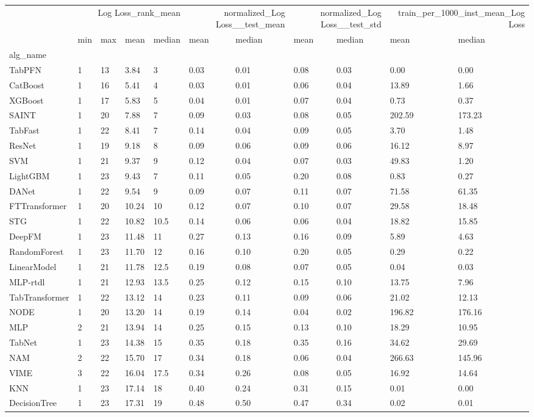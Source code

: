 \begin{tabular}{lllllllllll}
\toprule
 & \multicolumn{4}{r}{Log Loss_rank_mean} & \multicolumn{2}{r}{normalized_Log Loss__test_mean} & \multicolumn{2}{r}{normalized_Log Loss__test_std} & \multicolumn{2}{r}{train_per_1000_inst_mean_Log Loss} \\
 & min & max & mean & median & mean & median & mean & median & mean & median \\
alg_name &  &  &  &  &  &  &  &  &  &  \\
\midrule
TabPFN & 1 & 13 & 3.84 & 3 & 0.03 & 0.01 & 0.08 & 0.03 & 0.00 & 0.00 \\
CatBoost & 1 & 16 & 5.41 & 4 & 0.03 & 0.01 & 0.06 & 0.04 & 13.89 & 1.66 \\
XGBoost & 1 & 17 & 5.83 & 5 & 0.04 & 0.01 & 0.07 & 0.04 & 0.73 & 0.37 \\
SAINT & 1 & 20 & 7.88 & 7 & 0.09 & 0.03 & 0.08 & 0.05 & 202.59 & 173.23 \\
TabFast & 1 & 22 & 8.41 & 7 & 0.14 & 0.04 & 0.09 & 0.05 & 3.70 & 1.48 \\
ResNet & 1 & 19 & 9.18 & 8 & 0.09 & 0.06 & 0.09 & 0.06 & 16.12 & 8.97 \\
SVM & 1 & 21 & 9.37 & 9 & 0.12 & 0.04 & 0.07 & 0.03 & 49.83 & 1.20 \\
LightGBM & 1 & 23 & 9.43 & 7 & 0.11 & 0.05 & 0.20 & 0.08 & 0.83 & 0.27 \\
DANet & 1 & 22 & 9.54 & 9 & 0.09 & 0.07 & 0.11 & 0.07 & 71.58 & 61.35 \\
FTTransformer & 1 & 20 & 10.24 & 10 & 0.12 & 0.07 & 0.10 & 0.07 & 29.58 & 18.48 \\
STG & 1 & 22 & 10.82 & 10.5 & 0.14 & 0.06 & 0.06 & 0.04 & 18.82 & 15.85 \\
DeepFM & 1 & 23 & 11.48 & 11 & 0.27 & 0.13 & 0.16 & 0.09 & 5.89 & 4.63 \\
RandomForest & 1 & 23 & 11.70 & 12 & 0.16 & 0.10 & 0.20 & 0.05 & 0.29 & 0.22 \\
LinearModel & 1 & 21 & 11.78 & 12.5 & 0.19 & 0.08 & 0.07 & 0.05 & 0.04 & 0.03 \\
MLP-rtdl & 1 & 21 & 12.93 & 13.5 & 0.25 & 0.12 & 0.15 & 0.10 & 13.75 & 7.96 \\
TabTransformer & 1 & 22 & 13.12 & 14 & 0.23 & 0.11 & 0.09 & 0.06 & 21.02 & 12.13 \\
NODE & 1 & 20 & 13.20 & 14 & 0.19 & 0.14 & 0.04 & 0.02 & 196.82 & 176.16 \\
MLP & 2 & 21 & 13.94 & 14 & 0.25 & 0.15 & 0.13 & 0.10 & 18.29 & 10.95 \\
TabNet & 1 & 23 & 14.38 & 15 & 0.35 & 0.18 & 0.35 & 0.16 & 34.62 & 29.69 \\
NAM & 2 & 22 & 15.70 & 17 & 0.34 & 0.18 & 0.06 & 0.04 & 266.63 & 145.96 \\
VIME & 3 & 22 & 16.04 & 17.5 & 0.34 & 0.26 & 0.08 & 0.05 & 16.92 & 14.64 \\
KNN & 1 & 23 & 17.14 & 18 & 0.40 & 0.24 & 0.31 & 0.15 & 0.01 & 0.00 \\
DecisionTree & 1 & 23 & 17.31 & 19 & 0.48 & 0.50 & 0.47 & 0.34 & 0.02 & 0.01 \\
\bottomrule
\end{tabular}
